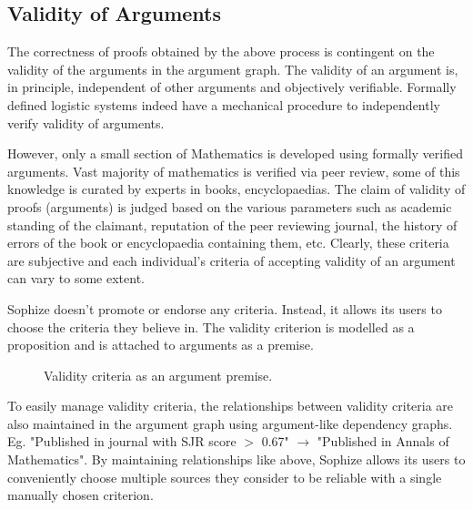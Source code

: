 \documentclass[a4paper]{article}
\begin{document}
\subsection{Validity of Arguments}

The correctness of proofs obtained by the above process is contingent on the validity of the arguments in the argument graph. The validity of an argument is, in principle, independent of other arguments and objectively verifiable. Formally defined logistic systems indeed have a mechanical procedure to independently verify validity of arguments.

However, only a small section of Mathematics is developed using formally verified arguments. Vast majority of mathematics is verified via peer review, some of this knowledge is curated by experts in books, encyclopaedias. The claim of validity of proofs (arguments) is judged based on the various parameters such as academic standing of the claimant, reputation of the peer reviewing journal, the history of errors of the book or encyclopaedia containing them, etc. Clearly, these criteria are subjective and each individual's criteria of accepting validity of an argument can vary to some extent.

Sophize doesn't promote or endorse any criteria. Instead, it allows its users to choose the criteria they believe in. The validity criterion is modelled as a proposition and is attached to arguments as a premise. 

\begin{figure}[htbp]
\begin{center}
\caption{Validity criteria as an argument premise.}
\label{validity_criterion}
\end{center}
\end{figure}

To easily manage validity criteria, the relationships between validity criteria are also maintained in the argument graph using argument-like dependency graphs. Eg. "Published in journal with SJR score $>$ 0.67" $\rightarrow$ "Published in Annals of Mathematics". By maintaining relationships like above, Sophize allows its users to conveniently choose multiple sources they consider to be reliable with a single manually chosen criterion. 
\end{document}
